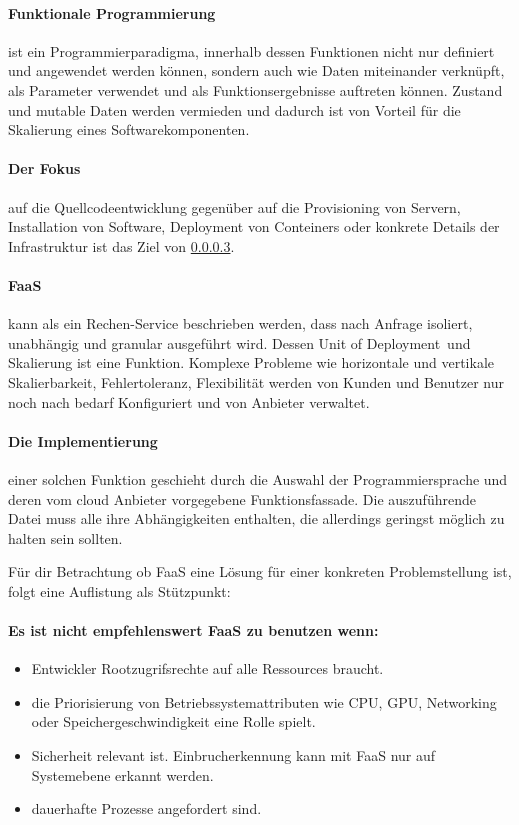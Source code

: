 \documentclass[
12pt,
english,
ngerman,
headsepline,
twoside,
openright,
numbers=noenddot,version=first
]{scrreprt}
\begin{document}
\paragraph{Funktionale Programmierung} ist ein Programmierparadigma, innerhalb dessen Funktionen nicht nur definiert und angewendet werden können, sondern auch wie Daten miteinander verknüpft, als Parameter verwendet und als Funktionsergebnisse auftreten können. Zustand und mutable Daten werden vermieden und dadurch ist von Vorteil für die Skalierung eines Softwarekomponenten.\cite{funcScala}

\paragraph{Der Fokus} auf die Quellcodeentwicklung gegenüber auf die Provisioning von Servern, Installation von Software, Deployment von Conteiners oder konkrete Details der Infrastruktur ist das Ziel von \ref{sec:faas}.\\

\paragraph{\acrshort{FaaS}}\label{sec:faas} kann als ein Rechen-Service beschrieben werden, dass nach Anfrage isoliert, unabhängig und granular ausgeführt wird. Dessen \glqq Unit of Deployment\grqq\ und Skalierung ist eine Funktion. 
Komplexe Probleme wie horizontale und vertikale Skalierbarkeit, Fehlertoleranz, Flexibilität werden von Kunden und Benutzer nur noch nach bedarf Konfiguriert und von Anbieter verwaltet\cite{patternAWS}.

\paragraph{Die Implementierung} einer solchen Funktion geschieht durch die Auswahl der Programmiersprache und deren vom cloud Anbieter vorgegebene Funktionsfassade. Die auszuführende Datei muss alle ihre Abhängigkeiten enthalten, die allerdings geringst möglich zu halten sein sollten.


Für dir Betrachtung ob \acrshort{FaaS} eine Lösung für einer konkreten Problemstellung ist, folgt eine Auflistung als Stützpunkt:
\paragraph{Es ist nicht empfehlenswert \acrshort{FaaS} zu benutzen wenn:}
\begin{itemize}
	\item Entwickler Rootzugrifsrechte auf alle Ressources braucht.
	\item die Priorisierung von Betriebssystemattributen wie CPU, GPU, Networking oder Speichergeschwindigkeit eine Rolle spielt.
	\item Sicherheit relevant ist. Einbrucherkennung kann mit \acrshort{FaaS} nur auf Systemebene erkannt werden.
	\item dauerhafte Prozesse angefordert sind.
\end{itemize}
\end{document}
